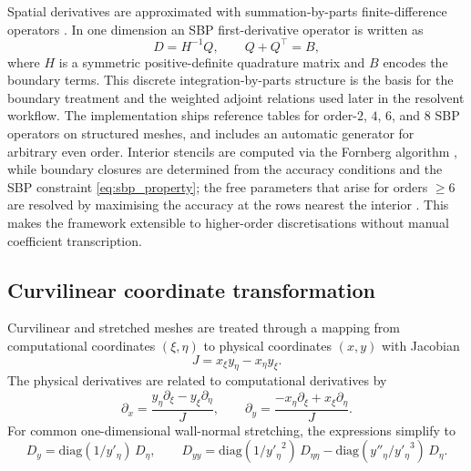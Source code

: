 \documentclass[11pt]{article}
\newcommand{\pp}{\partial}
\begin{document}
Spatial derivatives are approximated with summation-by-parts finite-difference
operators \citep{mattsson2004summation}. In one dimension an
SBP first-derivative operator is written as
\begin{equation}
  D = H^{-1}Q,
  \qquad
  Q + Q^\top = B,
  \label{eq:sbp_property}
\end{equation}
where $H$ is a symmetric positive-definite quadrature matrix and $B$ encodes
the boundary terms. This discrete integration-by-parts structure is the basis
for the boundary treatment and the weighted adjoint relations used later in the
resolvent workflow. The implementation ships reference tables for order-$2$,
$4$, $6$, and $8$ SBP operators on structured meshes, and includes an
automatic generator for arbitrary even order. Interior stencils are computed
via the Fornberg algorithm \citep{fornberg1988generation}, while boundary
closures are determined from the accuracy conditions and the SBP constraint
\eqref{eq:sbp_property}; the free parameters that arise for orders $\ge 6$
are resolved by maximising the accuracy at the rows nearest the interior
\citep{strand1994summation}. This makes the framework extensible to
higher-order discretisations without manual coefficient transcription.

\subsection{Curvilinear coordinate transformation}
\label{sec:curvilinear}

Curvilinear and stretched meshes are treated through a mapping from
computational coordinates $(\xi,\eta)$ to physical coordinates $(x,y)$ with
Jacobian
\begin{equation}
  J = x_\xi y_\eta - x_\eta y_\xi.
  \label{eq:jacobian}
\end{equation}
The physical derivatives are related to computational derivatives by
\begin{equation}
  \pp_x = \frac{ y_\eta \pp_\xi - y_\xi \pp_\eta}{J},
  \qquad
  \pp_y = \frac{-x_\eta \pp_\xi + x_\xi \pp_\eta}{J}.
  \label{eq:curv_first}
\end{equation}
For common one-dimensional wall-normal stretching, the expressions simplify to
\begin{equation}
  D_y = \mathrm{diag}(1/y'_\eta)\,D_\eta,
  \qquad
  D_{yy}
  = \mathrm{diag}(1/{y'_\eta}^2)\,D_{\eta\eta}
  - \mathrm{diag}(y''_\eta/{y'_\eta}^3)\,D_\eta.
  \label{eq:1d_stretch}
\end{equation}
\end{document}

